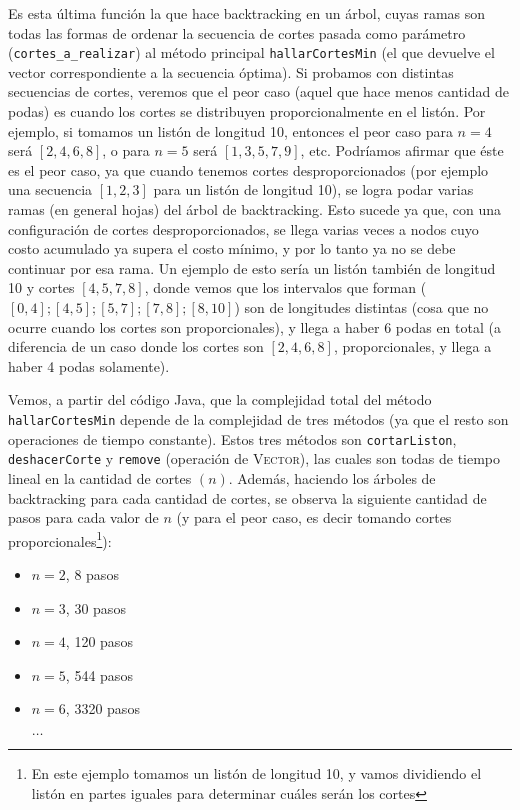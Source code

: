 \documentclass[12pt, a4paper,english,spanish]{article}
\begin{document}
Es esta \'ultima funci\'on la que hace backtracking en un \'arbol, cuyas ramas son todas las formas de ordenar la secuencia de cortes pasada como par\'ametro (\texttt{cortes\_a\_realizar}) al m\'etodo principal \texttt{hallarCortesMin} (el que devuelve el vector correspondiente a la secuencia \'optima). Si probamos con distintas secuencias de cortes, veremos que el peor caso (aquel que hace menos cantidad de podas) es cuando los cortes se distribuyen proporcionalmente en el list\'on. Por ejemplo, si tomamos un list\'on de longitud 10, entonces el peor caso para $n=4$ ser\'a $[2,4,6,8]$, o para $n=5$ ser\'a $[1,3,5,7,9]$, etc. Podr\'iamos afirmar que \'este es el peor caso, ya que cuando tenemos cortes desproporcionados (por ejemplo una secuencia $[1,2,3]$ para un list\'on de longitud 10), se logra podar varias ramas (en general hojas) del \'arbol de backtracking. Esto sucede ya que, con una configuraci\'on de cortes desproporcionados, se llega varias veces a nodos cuyo costo acumulado ya supera el costo m\'inimo, y por lo tanto ya no se debe continuar por esa rama. Un ejemplo de esto ser\'ia un list\'on tambi\'en de longitud 10 y cortes $[4,5,7,8]$, donde vemos que los intervalos que forman ($[0,4]; [4,5]; [5,7]; [7,8]; [8,10]$) son de longitudes distintas (cosa que no ocurre cuando los cortes son proporcionales), y llega a haber 6 podas en total (a diferencia de un caso donde los cortes son $[2,4,6,8]$, proporcionales, y llega a haber 4 podas solamente).   

Vemos, a partir del c\'odigo Java, que la complejidad total del m\'etodo \texttt{hallarCortesMin} depende de la complejidad de tres m\'etodos (ya que el resto son operaciones de tiempo constante). Estos tres m\'etodos son \texttt{cortarListon}, \texttt{deshacerCorte} y \texttt{remove} (operaci\'on de \textsc{Vector}), las cuales son todas de tiempo lineal en la cantidad de cortes $(n)$. Adem\'as, haciendo los \'arboles de backtracking para cada cantidad de cortes, se observa la siguiente cantidad de pasos para cada valor de $n$ (y para el peor caso, es decir tomando cortes proporcionales\footnote{En este ejemplo tomamos un list\'on de longitud 10, y vamos dividiendo el list\'on en partes iguales para determinar cu\'ales ser\'an los cortes}):
\begin{itemize}
\item $n=2$, 8 pasos 
\item $n=3$, 30 pasos 
\item $n=4$, 120 pasos
\item $n=5$, 544 pasos
\item $n=6$, 3320 pasos

$\ldots$
\end{itemize}
\end{document}

